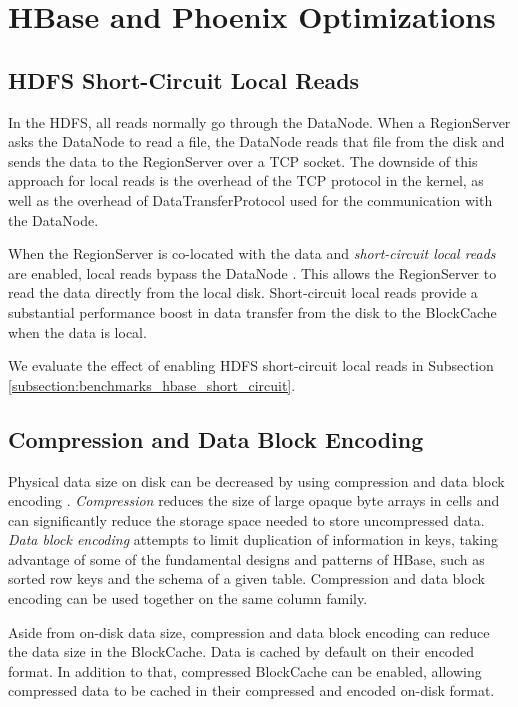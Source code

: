 \chapter{HBase and Phoenix Optimizations}\label{chapter:optimizations}

\section{HDFS Short-Circuit Local Reads}\label{section:optimizations_short_circuit}

In the HDFS, all reads normally go through the DataNode. When a RegionServer asks the DataNode to read a file, the DataNode reads that file from the disk and sends the data to the RegionServer over a TCP socket. The downside of this approach for local reads is the overhead of the TCP protocol in the kernel, as well as the overhead of DataTransferProtocol used for the communication with the DataNode.

When the RegionServer is co-located with the data and \emph{short-circuit local reads} are enabled, local reads bypass the DataNode \cite{hadoop_short-circuit,cloudera_short-circuit}. This allows the RegionServer to read the data directly from the local disk. Short-circuit local reads provide a substantial performance boost in data transfer from the disk to the BlockCache when the data is local.

We evaluate the effect of enabling HDFS short-circuit local reads in Subsection \ref{subsection:benchmarks_hbase_short_circuit}.


\section{Compression and Data Block Encoding}\label{section:compression_encoding}

Physical data size on disk can be decreased by using compression and data block encoding \cite{hbase_reference}. \emph{Compression} reduces the size of large opaque byte arrays in cells and can significantly reduce the storage space needed to store uncompressed data. \emph{Data block encoding} attempts to limit duplication of information in keys, taking advantage of some of the fundamental designs and patterns of HBase, such as sorted row keys and the schema of a given table. Compression and data block encoding can be used together on the same column family.

Aside from on-disk data size, compression and data block encoding can reduce the data size in the BlockCache. Data is cached by default on their encoded format. In addition to that, compressed BlockCache can be enabled, allowing compressed data to be cached in their compressed and encoded on-disk format.

